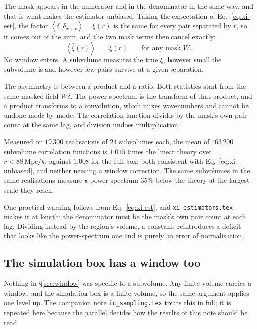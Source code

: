 \documentclass[12pt]{article}
\newcommand{\avg}[1]{\left\langle #1 \right\rangle}
\begin{document}
The mask appears in the numerator and in the denominator in the same way, and
that is what makes the estimator unbiased. Taking the expectation of
Eq.~\eqref{eq:xi-est}, the factor $\avg{\delta_x \delta_{x+r}} = \xi(r)$ is the
same for every pair separated by $r$, so it comes out of the sum, and the two
mask terms then cancel exactly:
\begin{equation}
  \label{eq:xi-unbiased}
  \avg{\hat\xi(r)} \;=\; \xi(r)
  \qquad\text{for any mask } W .
\end{equation}
No window enters. A subvolume measures the true $\xi$, however small the
subvolume is and however few pairs survive at a given separation.

The asymmetry is between a product and a ratio. Both statistics start from the
same masked field $W\delta$. The power spectrum is the transform of that
product, and a product transforms to a convolution, which mixes wavenumbers and
cannot be undone mode by mode. The correlation function divides by the mask's
own pair count at the same lag, and division undoes multiplication.

Measured on $19\,300$ realisations of $24$ subvolumes each, the mean of
$463\,200$ subvolume correlation functions is $1.015$ times the linear theory
over $r < 88\,\mathrm{Mpc}/h$, against $1.008$ for the full box: both consistent
with Eq.~\eqref{eq:xi-unbiased}, and neither needing a window correction. The
same subvolumes in the same realisations measure a power spectrum $35\%$ below
the theory at the largest scale they reach.

One practical warning follows from Eq.~\eqref{eq:xi-est}, and
\texttt{xi\_estimators.tex} makes it at length: the denominator must be the
mask's own pair count at each lag. Dividing instead by the region's volume, a
constant, reintroduces a deficit that looks like the power-spectrum one and is
purely an error of normalisation.

\subsection{The simulation box has a window too}
\label{sec:boxwindow}

Nothing in \S\ref{sec:window} was specific to a subvolume. Any finite volume
carries a window, and the simulation box is a finite volume, so the same
argument applies one level up. The companion note \texttt{ic\_sampling.tex}
treats this in full; it is repeated here because the parallel decides how the
results of this note should be read.
\end{document}
